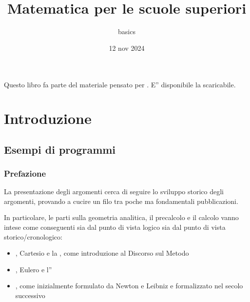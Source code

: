 \documentclass[letterpaper,10pt,italian]{jupyterBook}
\title{Matematica per le scuole superiori}
\date{12 nov 2024}
\author{basics}
\begin{document}
\pagestyle{empty}
\sphinxmaketitle
\pagestyle{plain}
\sphinxtableofcontents
\pagestyle{normal}
\label{\detokenize{intro::doc}}


\sphinxAtStartPar
Questo libro fa parte del materiale pensato per . E” disponibile la  scaricabile.







\sphinxstepscope


\part{Introduzione}

\sphinxstepscope


\chapter{Esempi di programmi}
\label{\detokenize{ch/school-programs:esempi-di-programmi}}\label{\detokenize{ch/school-programs::doc}}
\sphinxAtStartPar
{}

\sphinxstepscope


\section{Prefazione}
\label{\detokenize{ch/school-programs/intro:prefazione}}\label{\detokenize{ch/school-programs/intro::doc}}
\sphinxAtStartPar
La presentazione degli argomenti cerca di seguire lo sviluppo storico degli argomenti, provando a cucire un filo tra poche ma fondamentali pubblicazioni.

\sphinxAtStartPar
In particolare, le parti sulla geometria analitica, il precalcolo e il calcolo vanno intese come conseguenti sia dal punto di vista logico sia dal punto di vista storico/cronologico:
\begin{itemize}
\item {} 
\sphinxAtStartPar
{}, Cartesio e la , come introduzione al Discorso sul Metodo

\item {} 
\sphinxAtStartPar
{}, Eulero e l”

\item {} 
\sphinxAtStartPar
{}, come inizialmente formulato da Newton e Leibniz e formalizzato nel secolo successivo

\end{itemize}
\end{document}
